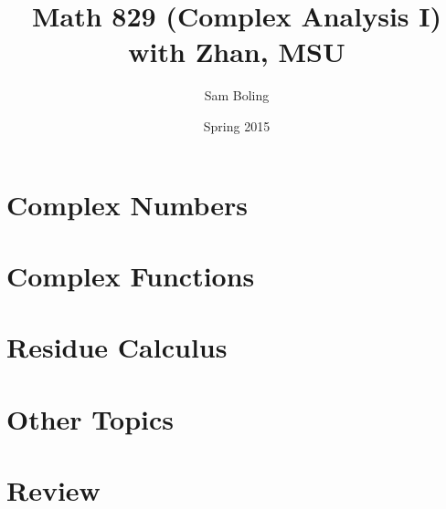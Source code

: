 \documentclass{report}
\title{Math 829 (Complex Analysis I) with Zhan, MSU}
\author{Sam Boling}
\date{Spring 2015}
\begin{document}
\maketitle

\chapter{Complex Numbers}



\chapter{Complex Functions}







\chapter{Residue Calculus}





\chapter{Other Topics}



\chapter{Review}

\end{document}
